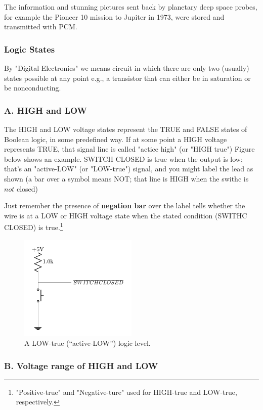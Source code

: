 The information and stunning pictures sent back by planetary deep space probes, for example the Pioneer 10
mission to Jupiter in 1973, were stored and transmitted with PCM.

\newpage
{}
\subsubsection{Logic States}
By "Digital Electronics" we means circuit in which there are only two (usually) states possible at any 
point e.g., a transistor that can either be in saturation or be nonconducting.

\subsubsection*{A. HIGH and LOW}
The HIGH and LOW voltage states represent the TRUE and FALSE states of Boolean logic, in some predefined way.
If at some point a HIGH voltage represents TRUE, that signal line is called "actice high" (or "HIGH true") 
Figure below shows an example. SWITCH CLOSED is true when the output is low; that's an "active-LOW" 
(or "LOW-true") signal, and you might label the lead as shown (a bar over a symbol means NOT; that line is
HIGH when the swithc is $not$ closed)   

Just remember the presence of \textbf{negation bar} over the label tells whether the wire is at a LOW or HIGH
voltage state when the stated condition (SWITHC CLOSED) is true.\footnote{"Positive-true" and "Negative-ture" used for HIGH-true
and LOW-true, respectively.}

\begin{figure}[h!]
    \centering
    \includegraphics[width=0.5\textwidth]{10.1.pdf}
    \caption{A LOW-true (“active-LOW”) logic level.}
    \label{fig:lowtrue}
\end{figure}

\subsubsection*{B. Voltage range of HIGH and LOW}
